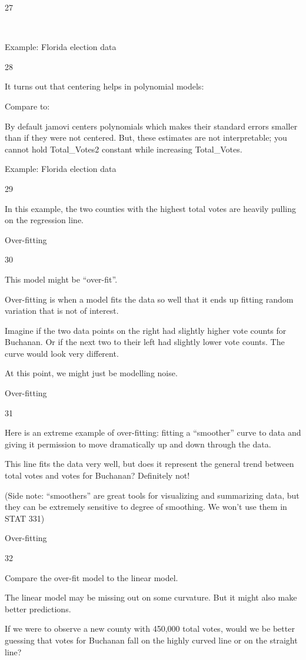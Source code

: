 \documentclass[
  letterpaper,
  DIV=11,
  numbers=noendperiod]{scrreprt}
\begin{document}
27

~

Example: Florida election data

28

It turns out that centering helps in polynomial models:

Compare to:

By default jamovi centers polynomials which makes their standard errors
smaller than if they were not centered. But, these estimates are not
interpretable; you cannot hold Total\_Votes2 constant while increasing
Total\_Votes.

Example: Florida election data

29

In this example, the two counties with the highest total votes are
heavily pulling on the regression line.

Over-fitting

30

This model might be ``over-fit''.

Over-fitting is when a model fits the data so well that it ends up
fitting random variation that is not of interest.

Imagine if the two data points on the right had slightly higher vote
counts for Buchanan. Or if the next two to their left had slightly lower
vote counts. The curve would look very different.

At this point, we might just be modelling noise.

Over-fitting

31

Here is an extreme example of over-fitting: fitting a ``smoother'' curve
to data and giving it permission to move dramatically up and down
through the data.

This line fits the data very well, but does it represent the general
trend between total votes and votes for Buchanan? Definitely not!

(Side note: ``smoothers'' are great tools for visualizing and
summarizing data, but they can be extremely sensitive to degree of
smoothing. We won't use them in STAT 331)

Over-fitting

32

Compare the over-fit model to the linear model.

The linear model may be missing out on some curvature. But it might also
make better predictions.

If we were to observe a new county with 450,000 total votes, would we be
better guessing that votes for Buchanan fall on the highly curved line
or on the straight line?
\end{document}
